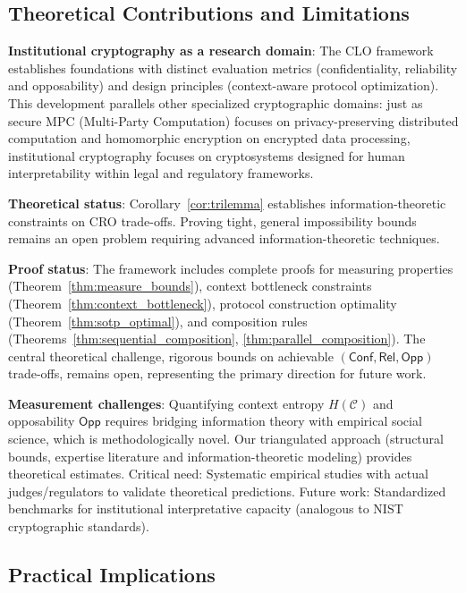 \documentclass{ieeeaccess}
\begin{document}
\subsection{Theoretical Contributions and Limitations}

\textbf{Institutional cryptography as a research domain}: The CLO framework establishes foundations with distinct evaluation metrics (confidentiality, reliability and opposability) and design principles (context-aware protocol optimization). This development parallels other specialized cryptographic domains: just as secure MPC (Multi-Party Computation) focuses on privacy-preserving distributed computation and homomorphic encryption on encrypted data processing, institutional cryptography focuses on cryptosystems designed for human interpretability within legal and regulatory frameworks.

\textbf{Theoretical status}: Corollary~\ref{cor:trilemma} establishes information-theoretic constraints on CRO trade-offs. Proving tight, general impossibility bounds remains an open problem requiring advanced information-theoretic techniques.

\textbf{Proof status}: The framework includes complete proofs for measuring properties (Theorem~\ref{thm:measure_bounds}), context bottleneck constraints (Theorem~\ref{thm:context_bottleneck}), protocol construction optimality (Theorem~\ref{thm:sotp_optimal}), and composition rules (Theorems~\ref{thm:sequential_composition}, \ref{thm:parallel_composition}). The central theoretical challenge, rigorous bounds on achievable $(\mathsf{Conf}, \mathsf{Rel}, \mathsf{Opp})$ trade-offs, remains open, representing the primary direction for future work.

\textbf{Measurement challenges}: Quantifying context entropy $H(\mathcal{C})$ and opposability $\mathsf{Opp}$ requires bridging information theory with empirical social science, which is methodologically novel. Our triangulated approach (structural bounds, expertise literature and information-theoretic modeling) provides theoretical estimates. Critical need: Systematic empirical studies with actual judges/regulators to validate theoretical predictions. Future work: Standardized benchmarks for institutional interpretative capacity (analogous to NIST cryptographic standards).

\subsection{Practical Implications}
\end{document}
